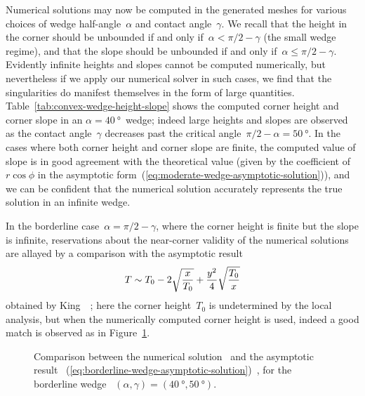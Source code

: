 Numerical solutions may now be computed in the generated meshes
for various choices of wedge half-angle~$\alpha$ and contact angle~$\gamma$.
We recall that the height in the corner should be unbounded
if and only if~$\alpha < \pi/2 - \gamma$ (the small wedge regime),
and that the slope should be unbounded
if and only if~$\alpha \le \pi/2 - \gamma$.
Evidently infinite heights and slopes cannot be computed numerically,
but nevertheless if we apply our numerical solver in such cases,
we find that the singularities do manifest themselves
in the form of large quantities.
Table~\ref{tab:convex-wedge-height-slope}
shows the computed corner height and corner slope
in an $\alpha = \SI{40}{\degree}$~wedge;
indeed large heights and slopes are observed
as the contact angle~$\gamma$
decreases past the critical angle~$\pi/2 - \alpha = \SI{50}{\degree}$.
In the cases where both corner height and corner slope are finite,
the computed value of slope is in good agreement with the theoretical value
(given by the coefficient of~$r \cos\phi$
in the asymptotic form~(\ref{eq:moderate-wedge-asymptotic-solution})),
and we can be confident that the numerical solution
accurately represents the true solution in an infinite wedge.

In the borderline case~$\alpha = \pi/2 - \gamma$,
where the corner height is finite but the slope is infinite,
reservations about the near-corner validity of the numerical solutions
are allayed by a comparison with the asymptotic result
\begin{equation}
  T \sim
    T_0 - 2 \sqrt{\frac{x}{T_0}} + \frac{y^2}{4} \sqrt{\frac{T_0}{x}}
  \label{eq:borderline-wedge-asymptotic-solution}
\end{equation}
obtained by King~\etal~\cite{king-1999-laplace-young-near-corner};
here the corner height~$T_0$ is undetermined by the local analysis,
but when the numerically computed corner height is used,
indeed a good match is observed
as in Figure~\ref{fig:wedge_acute-borderline-asymptotic-comparison}.

\begin{figure}
  \newcommand*{\subfigurewidth}{0.45\textwidth}
  \centering
  \hspace*{\fill}
  \begin{subfigure}[t]{\subfigurewidth}
  \end{subfigure}
    \hfill
  \begin{subfigure}[t]{\subfigurewidth}
  \end{subfigure}
  \hspace*{\fill}
  \caption{
    Comparison between the numerical solution~
    and the asymptotic result~%
      (\ref{eq:borderline-wedge-asymptotic-solution})~,
    for the borderline wedge~%
      $(\alpha, \gamma) = (\SI{40}{\degree}, \SI{50}{\degree})$.
  }
  \label{fig:wedge_acute-borderline-asymptotic-comparison}
\end{figure}

